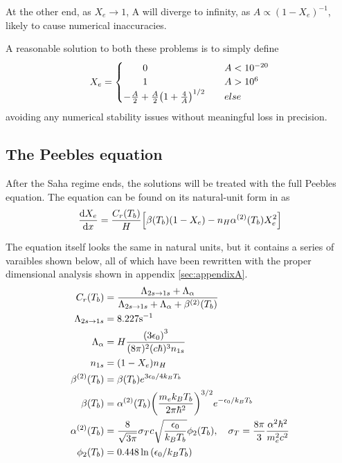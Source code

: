 \documentclass[10pt, a4paper]{article}
\begin{document}
At the other end, as $X_e \rightarrow 1$, A will diverge to infinity, as $A \propto (1 - X_e)^{-1}$, likely to cause numerical inaccuracies.

A reasonable solution \cite{Grandma} to both these problems is to simply define
\begin{equation}\label{eqn:Saha_sol2}
    X_e =
    \begin{cases}
        \quad\quad 0& \quad A < 10^{-20} \\
        \quad\quad 1& \quad A > 10^6 \\
        - \frac{A}{2} + \frac{A}{2}\qty(1 + \frac{4}{A})^{1/2}& \quad else
     \end{cases}    
\end{equation}
avoiding any numerical stability issues without meaningful loss in precision.


\subsection{The Peebles equation}\label{sec:Peebles}
After the Saha regime ends, the solutions will be treated with the full Peebles equation. The equation can be found on its natural-unit form in \cite{ModernCosmology2003} as
\begin{equation}
    \label{eqn:Peebles}
    \dv{X_{e}}{x}=\frac{C_{r}\qty(T_{b})}{H}\qty[\beta\qty(T_{b})\qty(1-X_{e})-n_{H} \alpha^{(2)}\qty(T_{b}) X_{e}^{2}]
\end{equation}

The equation itself looks the same in natural units, but it contains a series of varaibles shown below, all of which have been rewritten with the proper dimensional analysis shown in appendix \ref{sec:appendixA}.
\begin{align}
    \label{eqn:1x}
    C_{r}\qty(T_{b}) &=\frac{\Lambda_{2 s \rightarrow 1 s}+\Lambda_{\alpha}}{\Lambda_{2 s \rightarrow 1 s}+\Lambda_{\alpha}+\beta^{(2)}\qty(T_{b})} \\
    \label{eqn:2x}
    \Lambda_{2 s \rightarrow 1 s} &=8.227 \mathrm{s}^{-1} \\
    \label{eqn:4x}
    \Lambda_{\alpha} &= H \frac{\qty(3 \epsilon_{0})^{3}}{(8 \pi)^{2} (c\hbar)^3 n_{1 s}} \\
    \label{eqn:5x}
    n_{1 s} &=\qty(1-X_{e}) n_{H} \\
    \label{eqn:6x}
    \beta^{(2)}\qty(T_{b}) &=\beta\qty(T_{b}) e^{3 \epsilon_{0} / 4 k_B T_{b}} \\
    \label{eqn:7x}
    \beta\qty(T_{b}) &= \alpha^{(2)}\qty(T_{b}) \qty(\frac{m_{e} k_B T_{b}}{2 \pi \hbar^2})^{3 / 2} e^{-\epsilon_{0} / k_BT_{b}} \\
    \label{eqn:8x}
    \alpha^{(2)}\qty(T_{b}) &= \frac{8}{\sqrt{3 \pi}} \sigma_T c \sqrt{\frac{\epsilon_{0}}{k_B T_{b}}} \phi_{2}\qty(T_{b}), \quad \sigma_{T}=\frac{8 \pi}{3} \frac{\alpha^{2} \hbar^{2}}{m_{e}^{2} c^{2}} \\
    \label{eqn:9x}
    \phi_{2}\qty(T_{b}) &=0.448 \ln \qty(\epsilon_{0} / k_B T_{b})
\end{align}
\end{document}
